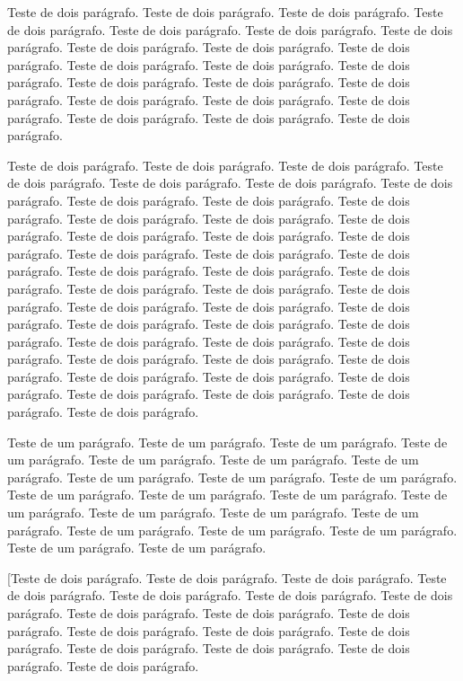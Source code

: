 \documentclass[12pt]{article}
\begin{document}
Teste de dois parágrafo. Teste de dois parágrafo. Teste de dois parágrafo. Teste de dois parágrafo. Teste de dois parágrafo. Teste de dois parágrafo. Teste de dois parágrafo. Teste de dois parágrafo. Teste de dois parágrafo. Teste de dois parágrafo. Teste de dois parágrafo. Teste de dois parágrafo. Teste de dois parágrafo. Teste de dois parágrafo. Teste de dois parágrafo. Teste de dois parágrafo. Teste de dois parágrafo. Teste de dois parágrafo. Teste de dois parágrafo. Teste de dois parágrafo. Teste de dois parágrafo. Teste de dois parágrafo.

Teste de dois parágrafo. Teste de dois parágrafo. Teste de dois parágrafo. Teste de dois parágrafo. Teste de dois parágrafo. Teste de dois parágrafo. Teste de dois parágrafo. Teste de dois parágrafo. Teste de dois parágrafo. Teste de dois parágrafo. Teste de dois parágrafo. Teste de dois parágrafo. Teste de dois parágrafo. Teste de dois parágrafo. Teste de dois parágrafo. Teste de dois parágrafo. Teste de dois parágrafo. Teste de dois parágrafo. Teste de dois parágrafo. Teste de dois parágrafo. Teste de dois parágrafo. Teste de dois parágrafo.
Teste de dois parágrafo. Teste de dois parágrafo. Teste de dois parágrafo. Teste de dois parágrafo. Teste de dois parágrafo. Teste de dois parágrafo. Teste de dois parágrafo. Teste de dois parágrafo. Teste de dois parágrafo. Teste de dois parágrafo. Teste de dois parágrafo. Teste de dois parágrafo. Teste de dois parágrafo. Teste de dois parágrafo. Teste de dois parágrafo. Teste de dois parágrafo. Teste de dois parágrafo. Teste de dois parágrafo. Teste de dois parágrafo. Teste de dois parágrafo. Teste de dois parágrafo. Teste de dois parágrafo.

Teste de um parágrafo. Teste de um parágrafo. Teste de um parágrafo. Teste de um parágrafo. Teste de um parágrafo. Teste de um parágrafo. Teste de um parágrafo. Teste de um parágrafo. Teste de um parágrafo. Teste de um parágrafo. Teste de um parágrafo. Teste de um parágrafo. Teste de um parágrafo. Teste de um parágrafo. Teste de um parágrafo. Teste de um parágrafo. Teste de um parágrafo. Teste de um parágrafo. Teste de um parágrafo. Teste de um parágrafo. Teste de um parágrafo. Teste de um parágrafo.

\revisao[Teste de dois parágrafo. Teste de dois parágrafo. Teste de dois parágrafo. Teste de dois parágrafo. Teste de dois parágrafo. Teste de dois parágrafo. Teste de dois parágrafo. Teste de dois parágrafo. Teste de dois parágrafo. Teste de dois parágrafo. Teste de dois parágrafo. Teste de dois parágrafo. Teste de dois parágrafo. Teste de dois parágrafo. Teste de dois parágrafo. Teste de dois parágrafo. Teste de dois parágrafo.
\end{document}
